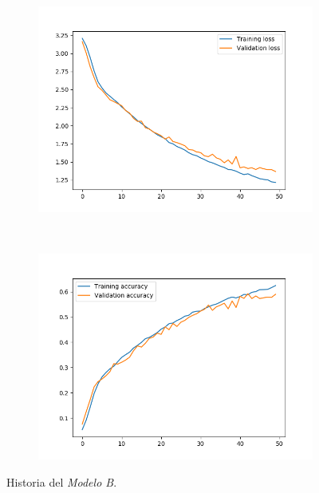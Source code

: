 \documentclass[11pt,a4paper]{article}
\begin{document}
\begin{figure}[H]
  \centering
  \begin{subfigure}{.5\textwidth}
    \centering
    \includegraphics[scale=0.4]{img/deep2-aug-loss.png}
    \label{fig:deep2-aug-loss}
  \end{subfigure}%
  ~ \quad
  \begin{subfigure}{.5\textwidth}
    \centering
    \includegraphics[scale=0.4]{img/deep2-aug-acc.png}
    \label{fig:deep2-aug-acc}
  \end{subfigure}
  \caption{Historia del \textit{Modelo B}.}
  \label{fig:deep2-aug}
\end{figure}
\end{document}
